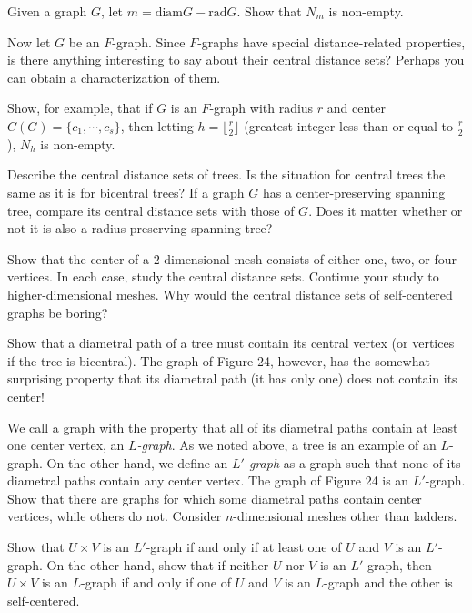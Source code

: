 \documentclass{article}
\begin{document}
\begin{description}
  Given a graph $G$, let $m = \text{diam} G - \text{rad} G$. Show that $N_m$ is non-empty.

  Now let $G$ be an $F$-graph. Since $F$-graphs have special distance-related properties, is there anything interesting to say about their central distance sets? Perhaps you can obtain a characterization of them.

  Show, for example, that if $G$ is an $F$-graph with radius $r$ and center $C(G) = \{ c_1,\cdots,c_s \}$, then letting $h = \lfloor \frac{r}{2} \rfloor$ (greatest integer less than or equal to $\frac{r}{2}$), $N_h$ is non-empty.

\item[40.] Describe the central distance sets of trees. Is the situation for central trees the same as it is for bicentral trees? If a graph $G$ has a center-preserving spanning tree, compare its central distance sets with those of $G$. Does it matter whether or not it is also a radius-preserving spanning tree?

  Show that the center of a $2$-dimensional mesh consists of either one, two, or four vertices. In each case, study the central distance sets. Continue your study to higher-dimensional meshes. Why would the central distance sets of self-centered graphs be boring?

\item[41.] Show that a diametral path of a tree must contain its central vertex (or vertices if the tree is bicentral). The graph of Figure 24, however, has the somewhat surprising property that its diametral path (it has only one) does not contain its center!

  We call a graph with the property that all of its diametral paths contain at least one center vertex, an \emph{$L$-graph}. As we noted above, a tree is an example of an $L$-graph. On the other hand, we define an \emph{$L'$-graph} as a graph such that none of its diametral paths contain any center vertex. The graph of Figure 24 is an $L'$-graph. Show that there are graphs for which some diametral paths contain center vertices, while others do not. Consider $n$-dimensional meshes other than ladders.

  Show that $U \times V$ is an $L'$-graph if and only if at least one of $U$ and $V$ is an $L'$-graph. On the other hand, show that if neither $U$ nor $V$ is an $L'$-graph, then $U \times V$ is an $L$-graph if and only if one of $U$ and $V$ is an $L$-graph and the other is self-centered.


\end{description}
\end{document}

